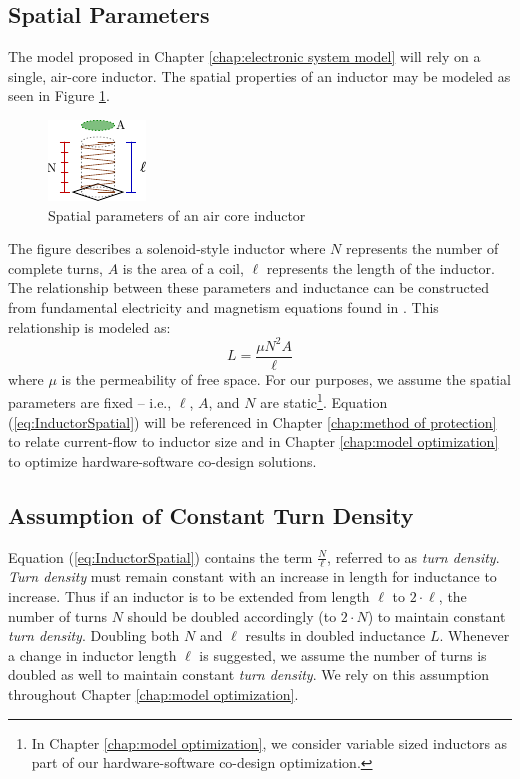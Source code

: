 \documentclass[11pt,oneside]{report}
\begin{document}
    \subsection{Spatial Parameters}
    The model proposed in Chapter \ref{chap:electronic system model} will rely on a single, air-core inductor. The spatial properties of an inductor may be modeled as seen in Figure \ref{fig:InductorParams}.
    \begin{figure}
        \centering
        \includegraphics[width=0.25\linewidth]{img/Inductor_Parameters.pdf}
        \caption[Air Core Inductor Spatial Parameters]{Spatial parameters of an air core inductor}
        \label{fig:InductorParams}
    \end{figure}
    The figure describes a solenoid-style inductor where $N$ represents the number of complete turns, $A$ is the area of a coil, $\ell$ represents the length of the inductor. The relationship between these parameters and inductance can be constructed from fundamental electricity and magnetism equations found in \cite{uniphy}. This relationship is modeled as:
    \begin{equation}\label{eq:InductorSpatial}
    L = \frac{\mu N^{2}A}{\ell}
    \end{equation}
    where $\mu$ is the permeability of free space. For our purposes, we assume the spatial parameters are fixed -- i.e., $\ell$, $A$, and $N$ are static\footnote{In Chapter \ref{chap:model optimization}, we consider variable sized inductors as part of our hardware-software co-design optimization.}. Equation (\ref{eq:InductorSpatial}) will be referenced in Chapter \ref{chap:method of protection} to relate current-flow to inductor size and in Chapter \ref{chap:model optimization} to optimize hardware-software co-design solutions.
    \subsection{Assumption of Constant Turn Density} \label{ssec:Assumption of Constant}
    Equation (\ref{eq:InductorSpatial}) contains the term $\frac{N}{\ell}$, referred to as \textit{turn density}. \textit{Turn density} must remain constant with an increase in length for inductance to increase. Thus if an inductor is to be extended from length $\ell$ to $2\cdot \ell$, the number of turns $N$ should be doubled accordingly (to $2\cdot N$) to maintain constant \textit{turn density}. Doubling both $N$ and $\ell$ results in doubled inductance $L$. Whenever a change in inductor length $\ell$ is suggested, we assume the number of turns is doubled as well to maintain constant \textit{turn density}. We rely on this assumption throughout Chapter \ref{chap:model optimization}.
\end{document}
